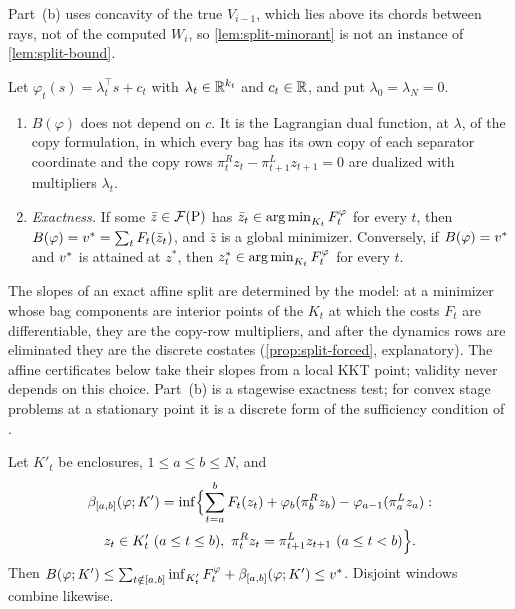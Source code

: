 Part~(b) uses concavity of the true $V_{i-1}$, which lies above its chords between rays, not of the computed $W_i$, so \cref{lem:split-minorant} is not an instance of \cref{lem:split-bound}.

\begin{proposition}\label{prop:split-affine}
Let $\varphi_t(s)=\lambda_t^\top s+c_t$ with $\lambda_t\in\R^{k_t}$ and $c_t\in\R$, and put $\lambda_0=\lambda_N=0$.
\begin{enumerate}
\item[(a)] $B(\varphi)$ does not depend on $c$.
  It is the Lagrangian dual function, at $\lambda$, of the copy formulation, in which every bag has its own copy of each separator coordinate and the copy rows $\pi^R_tz_t-\pi^L_{t+1}z_{t+1}=0$ are dualized with multipliers $\lambda_t$.
\item[(b)] \emph{Exactness.} If some $\bar z\in\feas[\mathrm P]$ has $\bar z_t\in\argmin_{K_t}F^\varphi_t$ for every $t$, then $B(\varphi)=\vstar=\sum_tF_t(\bar z_t)$, and $\bar z$ is a global minimizer.
  Conversely, if $B(\varphi)=\vstar$ and $\vstar$ is attained at $z^*$, then $z^*_t\in\argmin_{K_t}F^\varphi_t$ for every $t$.
\end{enumerate}
\end{proposition}

The slopes of an exact affine split are determined by the model: at a minimizer whose bag components are interior points of the $K_t$ at which the costs $F_t$ are differentiable, they are the copy-row multipliers, and after the dynamics rows are eliminated they are the discrete costates (\cref{prop:split-forced}, explanatory).
The affine certificates below take their slopes from a local KKT point; validity never depends on this choice.
Part~(b) is a stagewise exactness test; for convex stage problems at a stationary point it is a discrete form of the sufficiency condition of \citet{mangasarian1966-sufficient-conditions-for-the-optimal}.

\begin{proposition}[windows]\label{prop:split-window}
Let $K'_t$ be enclosures, $1\le a\le b\le N$, and
\begin{multline*}
  \beta_{[a,b]}(\varphi;K')=\inf\Bigl\{\sum_{t=a}^bF_t(z_t)+\varphi_b(\pi^R_bz_b)-\varphi_{a-1}(\pi^L_az_a) :\\
  z_t\in K'_t\ (a\le t\le b),\ \pi^R_tz_t=\pi^L_{t+1}z_{t+1}\ (a\le t<b)\Bigr\}.
\end{multline*}
Then $B(\varphi;K')\le\sum_{t\notin[a,b]}\inf_{K'_t}F^\varphi_t+\beta_{[a,b]}(\varphi;K')\le\vstar$.
Disjoint windows combine likewise.
\end{proposition}

